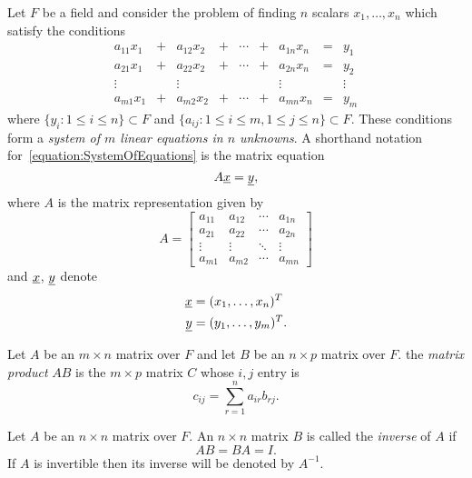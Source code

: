 Let $F$ be a field and consider the problem of finding $n$ scalars $x_1, \ldots, x_n$ which satisfy the conditions
\begin{equation} \label{equation:SystemOfEquations}
\begin{array}{ccccccccc}
a_{11} x_1 & + & a_{12} x_2 & + & \cdots & + & a_{1n} x_n & = & y_1 \\
a_{21} x_1 & + & a_{22} x_2 & + & \cdots & + & a_{2n} x_n & = & y_2 \\
\vdots & & \vdots  & & & & \vdots & & \vdots \\
a_{m1} x_1 & + & a_{m2} x_2 & + & \cdots & + & a_{mn} x_n & = & y_m
\end{array}
\end{equation}
where $\{ y_i : 1 \leq i \leq n \} \subset F$ and $\{ a_{ij} : 1 \leq i \leq m, 1 \leq j \leq n \} \subset F$.
These conditions form a \emph{system of $m$ linear equations in $n$ unknowns}.
A shorthand notation for~\eqref{equation:SystemOfEquations} is the matrix equation
\begin{equation*}
A \underline{x} = \underline{y},
\end{equation*}
where $A$ is the matrix representation given by
\begin{equation*}
A = \left[ \begin{array}{cccc}
a_{11} & a_{12} & \cdots & a_{1n} \\
a_{21} & a_{22} & \cdots & a_{2n} \\
\vdots & \vdots & \ddots & \vdots \\
a_{m1} & a_{m2} & \cdots & a_{mn}
\end{array} \right]
\end{equation*}
and $\underline{x}$, $\underline{y}$ denote
\begin{align*}
\underline{x} &= (x_1, \ldots, x_n)^T \\
\underline{y} &= (y_1, \ldots, y_m)^T .
\end{align*}

\begin{definition}
Let $A$ be an $m \times n$ matrix over $F$ and let $B$ be an $n \times p$ matrix over $F$.
the \emph{matrix product} $AB$ is the $m \times p$ matrix $C$ whose $i,j$ entry is
\begin{equation*}
c_{ij} = \sum_{r = 1}^n a_{ir} b_{rj}.
\end{equation*}
\end{definition}

\begin{definition}
Let $A$ be an $n \times n$ matrix over $F$.
An $n \times n$ matrix $B$ is called the \emph{inverse} of $A$ if
\begin{equation*}
AB = BA = I.
\end{equation*}
If $A$ is invertible then its inverse will be denoted by $A^{-1}$.
\end{definition}



